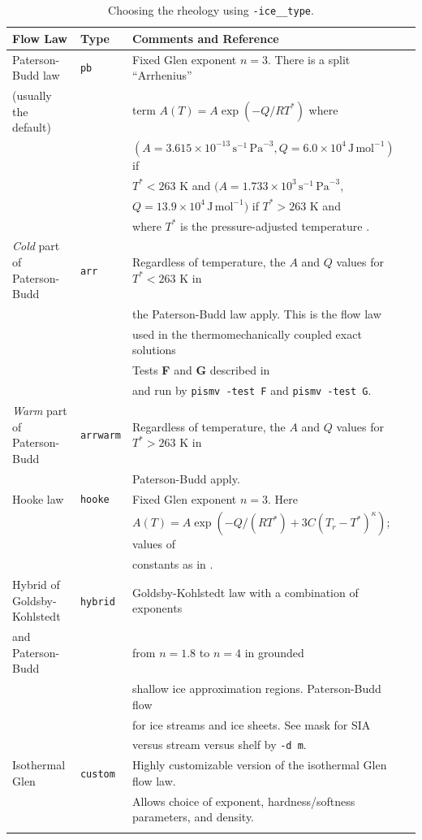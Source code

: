\documentclass[11pt,final]{amsart}
\renewcommand{\t}[1]{\texttt{#1}}
\newcommand{\und}{\_\!\_}
\begin{document}
\begin{table}[ht]
\caption{Choosing the rheology using \t{-ice\und type}.}\label{tab:flowlaw}
\small
\begin{tabular}{@{}llll}\hline
\textbf{Flow Law} & \textbf{Type} & \textbf{Comments and Reference} \\ \hline
Paterson-Budd law   &  \t{pb} &   Fixed Glen exponent $n=3$.  There is a split ``Arrhenius'' \\
\quad (usually the default) & & term $A(T) = A \exp(-Q/RT^*)$ where \\
  & & $(A = 3.615 \times 10^{-13}\, \text{s}^{-1}\, \text{Pa}^{-3}, Q = 6.0 \times 10^4\, \text{J}\, \text{mol}^{-1})$ if \\
  & & $T^* < 263$ K and $(A = 1.733 \times 10^{3}\, \text{s}^{-1}\, \text{Pa}^{-3}$, \\
  & & $Q = 13.9 \times 10^4\, \text{J}\, \text{mol}^{-1})$ if $T^* > 263$ K and \\
  & & where $T^*$ is the pressure-adjusted temperature \cite{PatersonBudd}.  \\
\emph{Cold} part of Paterson-Budd    &  \t{arr} &   Regardless of temperature, the $A$ and $Q$ values for $T^*<263$ K in \\
  & & the Paterson-Budd law apply.  This is the flow law \\
  & & used in the thermomechanically coupled exact solutions \\
  & & Tests \textbf{F} and \textbf{G} described in \cite{BBL,BB} \\
  & & and run by \verb|pismv -test F| and \verb|pismv -test G|.  \\
\emph{Warm} part of Paterson-Budd     &  \t{arrwarm} & Regardless of temperature, the $A$ and $Q$ values for $T^*>263$ K in \\
  & &  Paterson-Budd apply.    \\
Hooke law   &  \t{hooke} &  Fixed Glen exponent $n=3$.  Here \\
  & & $A(T) = A \exp(-Q/(RT^*) + 3C (T_r - T^*)^\kappa)$; values of \\
  & & constants as in \cite{Hooke,PayneBaldwin}.   \\
Hybrid of Goldsby-Kohlstedt &  \t{hybrid} &     Goldsby-Kohlstedt law with a combination of exponents  \\
  \qquad and Paterson-Budd & & from $n=1.8$ to $n=4$ \cite{GoldsbyKohlstedt} in grounded \\
  & & shallow ice approximation regions.  Paterson-Budd flow \\
  & & for ice streams and ice sheets. See mask for SIA \\
  & & versus stream versus shelf by \verb|-d m|. \\
Isothermal Glen & \t{custom} & Highly customizable version of the isothermal Glen flow law. \\
  & & Allows choice of exponent, hardness/softness parameters, and density. \\
\hline
\normalsize	
\end{tabular}
\end{table}
\end{document}
